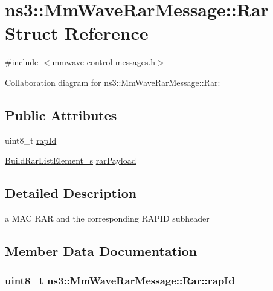 \hypertarget{structns3_1_1MmWaveRarMessage_1_1Rar}{}\section{ns3\+:\+:Mm\+Wave\+Rar\+Message\+:\+:Rar Struct Reference}
\label{structns3_1_1MmWaveRarMessage_1_1Rar}


{\ttfamily \#include $<$mmwave-\/control-\/messages.\+h$>$}



Collaboration diagram for ns3\+:\+:Mm\+Wave\+Rar\+Message\+:\+:Rar\+:
\subsection*{Public Attributes}
\begin{DoxyCompactItemize}
\item 
uint8\+\_\+t \hyperlink{structns3_1_1MmWaveRarMessage_1_1Rar_acdfb6bacbaba02a2513376b7d1b807b7}{rap\+Id}
\item 
\hyperlink{structns3_1_1BuildRarListElement__s}{Build\+Rar\+List\+Element\+\_\+s} \hyperlink{structns3_1_1MmWaveRarMessage_1_1Rar_a32b670d0695d5e29d480ee2b5a92f0da}{rar\+Payload}
\end{DoxyCompactItemize}


\subsection{Detailed Description}
a M\+AC R\+AR and the corresponding R\+A\+P\+ID subheader 

\subsection{Member Data Documentation}
\subsubsection[{\texorpdfstring{rap\+Id}{rapId}}]{\setlength{\rightskip}{0pt plus 5cm}uint8\+\_\+t ns3\+::\+Mm\+Wave\+Rar\+Message\+::\+Rar\+::rap\+Id}\hypertarget{structns3_1_1MmWaveRarMessage_1_1Rar_acdfb6bacbaba02a2513376b7d1b807b7}{}\label{structns3_1_1MmWaveRarMessage_1_1Rar_acdfb6bacbaba02a2513376b7d1b807b7}
